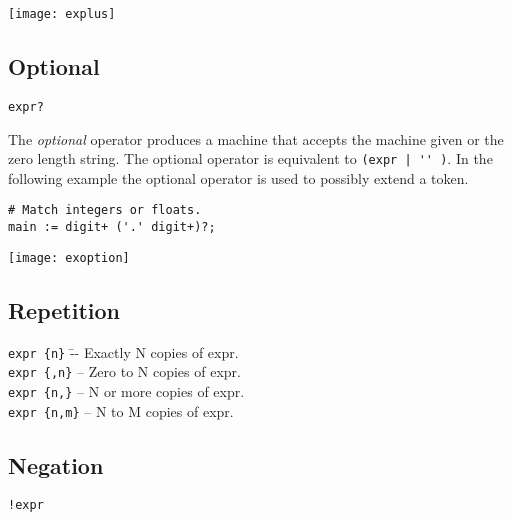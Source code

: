 \documentclass[letterpaper,11pt,oneside]{book}
\newcommand{\verbspace}{\vspace{10pt}}
\newcommand{\graphspace}{\vspace{10pt}}
\newenvironment{inline_code}{\def\baselinestretch{1}\vspace{12pt}\small}{}
\begin{document}
\graphspace
\begin{center}
\texttt{[image: explus]}
\end{center}
\graphspace

\subsection{Optional}

\verb|expr?|
\verbspace

The {\em optional} operator produces a machine that accepts the machine
given or the zero length string. The optional operator is equivalent to
\verb/(expr | '' )/. In the following example the optional operator is used to
possibly extend a token.

\begin{inline_code}
\begin{verbatim}
# Match integers or floats.
main := digit+ ('.' digit+)?;
\end{verbatim}
\end{inline_code}

\graphspace
\begin{center}
\texttt{[image: exoption]}
\end{center}
\graphspace

\subsection{Repetition}

\begin{tabbing}
\noindent \verb|expr {n}| \hspace{16pt}\=-- Exactly N copies of expr.\\

\noindent \verb|expr {,n}| \>-- Zero to N copies of expr.\\

\noindent \verb|expr {n,}| \>-- N or more copies of expr.\\

\noindent \verb|expr {n,m}| \>-- N to M copies of expr.
\end{tabbing}

\subsection{Negation}

\verb|!expr|
\verbspace
\end{document}
